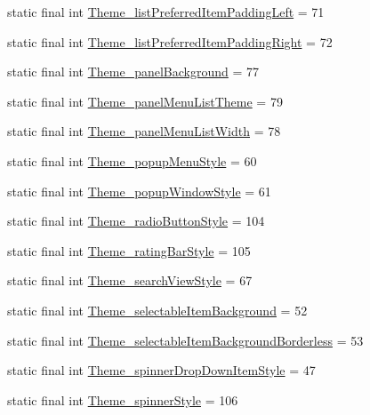 \begin{DoxyCompactItemize}
\item 
static final int \hyperlink{classcheck_1_1test_1_1_r_1_1styleable_ae246fdddad967741c0a3101714a40ef3}{Theme\+\_\+list\+Preferred\+Item\+Padding\+Left} = 71
\item 
static final int \hyperlink{classcheck_1_1test_1_1_r_1_1styleable_a784a9d6670f4b87a95a04b867b4b4e7b}{Theme\+\_\+list\+Preferred\+Item\+Padding\+Right} = 72
\item 
static final int \hyperlink{classcheck_1_1test_1_1_r_1_1styleable_a07ce7800e0d7dc1fce4e70ecde15e5a5}{Theme\+\_\+panel\+Background} = 77
\item 
static final int \hyperlink{classcheck_1_1test_1_1_r_1_1styleable_a1d6dd9a183e0165672173da100f35f74}{Theme\+\_\+panel\+Menu\+List\+Theme} = 79
\item 
static final int \hyperlink{classcheck_1_1test_1_1_r_1_1styleable_ac3385a441e77f588205019797ec7c36f}{Theme\+\_\+panel\+Menu\+List\+Width} = 78
\item 
static final int \hyperlink{classcheck_1_1test_1_1_r_1_1styleable_a84e7e01578f21a4c36f013d3e5d3b917}{Theme\+\_\+popup\+Menu\+Style} = 60
\item 
static final int \hyperlink{classcheck_1_1test_1_1_r_1_1styleable_a84838496bac2e683af2e800bfafd3f41}{Theme\+\_\+popup\+Window\+Style} = 61
\item 
static final int \hyperlink{classcheck_1_1test_1_1_r_1_1styleable_a28affc2ca7d484ddc9e704772938a600}{Theme\+\_\+radio\+Button\+Style} = 104
\item 
static final int \hyperlink{classcheck_1_1test_1_1_r_1_1styleable_ac5ebe24516424df00451d25bb71bf29c}{Theme\+\_\+rating\+Bar\+Style} = 105
\item 
static final int \hyperlink{classcheck_1_1test_1_1_r_1_1styleable_adf1afa34cedcf221081b21bda1f70e5c}{Theme\+\_\+search\+View\+Style} = 67
\item 
static final int \hyperlink{classcheck_1_1test_1_1_r_1_1styleable_a0316097f83d9af63e8806ec4839f94a9}{Theme\+\_\+selectable\+Item\+Background} = 52
\item 
static final int \hyperlink{classcheck_1_1test_1_1_r_1_1styleable_ab577cbb82ea3ae0fddb617a7cbc27530}{Theme\+\_\+selectable\+Item\+Background\+Borderless} = 53
\item 
static final int \hyperlink{classcheck_1_1test_1_1_r_1_1styleable_ac74684f630293fb28782a9ce322bad2c}{Theme\+\_\+spinner\+Drop\+Down\+Item\+Style} = 47
\item 
static final int \hyperlink{classcheck_1_1test_1_1_r_1_1styleable_aee62b48940c1b2da28bf4a38059b29ff}{Theme\+\_\+spinner\+Style} = 106

\end{DoxyCompactItemize}
